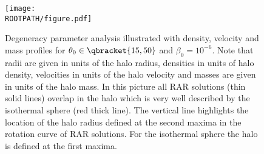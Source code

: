 \begin{figure}%
	\centering%
	\texttt{[image: \\ROOTPATH/figure.pdf]}
	\caption{Degeneracy parameter analysis illustrated with density, velocity and mass profiles for $\theta_0\in\qbracket{15,50}$ and $\beta_0 = 10^{-6}$. Note that radii are given in units of the halo radius, densities in units of halo density, velocities in units of the halo velocity and masses are given in units of the halo mass. In this picture all RAR solutions (thin solid lines) overlap in the halo which is very well described by the isothermal sphere (red thick line). The vertical line highlights the location of the halo radius defined at the second maxima in the rotation curve of RAR solutions. For the isothermal sphere the halo is defined at the first maxima.}%
	\label{fig:profiles:without-cutoff:central-degeneracy:halo}%
\end{figure}